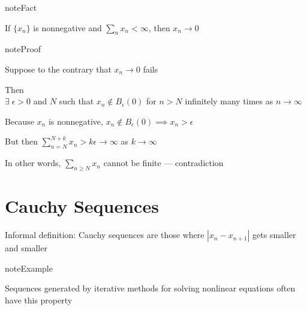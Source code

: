 \documentclass[letterpaper,10pt,english]{jupyterBook}
\begin{document}
\begin{sphinxadmonition}{note}{Fact}

\sphinxAtStartPar
If \(\{x_n\}\) is nonnegative and \(\sum_n x_n < \infty\), then \(x_n \to 0\)
\end{sphinxadmonition}

\begin{sphinxadmonition}{note}{Proof}

\sphinxAtStartPar
Suppose to the contrary that \(x_n \to 0\) fails

\sphinxAtStartPar
Then\\
\(\exists \; \epsilon > 0\) and \(N\) such that \(x_n \notin B_\epsilon(0)\) for \(n>N\) infinitely many times as \(n \to \infty\)

\sphinxAtStartPar
Because \(x_n\) is nonnegative, \(x_n \notin B_\epsilon(0) \implies x_n > \epsilon\)

\sphinxAtStartPar
But then \(\sum_{n = N}^{N+k} x_n > k \epsilon \to \infty\) as \(k \to \infty\)

\sphinxAtStartPar
In other words, \(\sum_{n \ge N} x_n\) cannot be finite — contradiction
\end{sphinxadmonition}


\section{Cauchy Sequences}
\label{\detokenize{04.basic_analysis:cauchy-sequences}}
\sphinxAtStartPar
Informal definition: Cauchy sequences are those where \(|x_n - x_{n+1}|\) gets smaller and smaller

\begin{figure}[htbp]
\centering

\noindent{}
\end{figure}

\begin{sphinxadmonition}{note}{Example}

\sphinxAtStartPar
Sequences generated by iterative methods for solving nonlinear equations often have this property
\end{sphinxadmonition}
\end{document}

